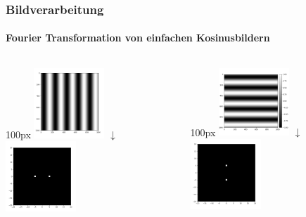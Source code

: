 \begin{frame}
    \frametitle{Bildverarbeitung}
    \framesubtitle{Fourier Transformation von einfachen Kosinusbildern}
    \begin{columns}
        \begin{column}{100px}
            \centering
            \includegraphics[width=100px]{images/04-applications-image-cos.png}
            $\downarrow$
            \includegraphics[width=100px]{images/04-applications-image-cos-ft.png}
        \end{column}
        \begin{column}{100px}
            \centering
            \includegraphics[width=100px]{images/04-applications-image-cos-rot.png}
            $\downarrow$
            \includegraphics[width=100px]{images/04-applications-image-cos-rot-ft.png}
        \end{column}
    \end{columns}
\end{frame}

